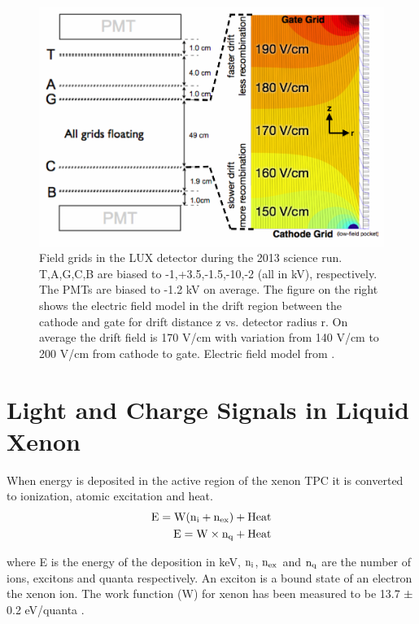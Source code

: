  \begin{figure}[h!]\centering
\includegraphics[scale=.4]{Chapter_LUX_Det/LUX_Feild_Grids_with_Field.png}
\caption{Field grids in the LUX detector during the 2013 science run. T,A,G,C,B are biased to -1,+3.5,-1.5,-10,-2 (all in kV), respectively. The PMTs are biased to -1.2 kV on average. The figure on the right shows the electric field model in the drift region between the cathode and gate for drift distance z vs. detector radius r. On average the drift field is 170 V/cm with variation from 140 V/cm to 200 V/cm  from cathode to gate. Electric field model from  \cite{Scott_E_Field}.}
\label{fig:LUX_Fields}
\end{figure}

\newpage

\section{Light and Charge Signals in Liquid Xenon}
\label{sec:LXe_Theory}
When energy is deposited in the active region of the xenon TPC it is converted to ionization, atomic excitation and heat.
\begin{equation}
\begin{split}
\rm E= W (n_i + n_{ex}) + Heat \\
\rm E= W \times n_q + Heat
\end{split}
\label{eq:E_Q}
\end{equation}

\noindent where E is the energy of the deposition in keV,  $\rm n_i$, $\rm n_{ex}$ and $\rm n_q$ are the number of ions, excitons and quanta respectively. An exciton is a bound state of an electron the xenon ion. The work function (W) for xenon has been measured to be 13.7 $\rm \pm$ 0.2  eV/quanta  \cite{Dahl_Thesis}. 

